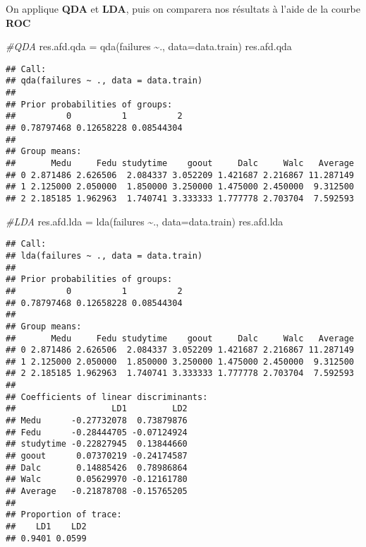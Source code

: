 \documentclass[
]{article}
\newenvironment{Shaded}{\begin{snugshade}}{\end{snugshade}}
\newcommand{\AttributeTok}[1]{\textcolor[rgb]{0.77,0.63,0.00}{#1}}
\newcommand{\CommentTok}[1]{\textcolor[rgb]{0.56,0.35,0.01}{\textit{#1}}}
\newcommand{\FunctionTok}[1]{\textcolor[rgb]{0.00,0.00,0.00}{#1}}
\newcommand{\NormalTok}[1]{#1}
\newcommand{\OtherTok}[1]{\textcolor[rgb]{0.56,0.35,0.01}{#1}}
\newcommand{\SpecialCharTok}[1]{\textcolor[rgb]{0.00,0.00,0.00}{#1}}
\begin{document}
On applique \textbf{QDA} et \textbf{LDA}, puis on comparera nos
résultats à l'aide de la courbe \textbf{ROC}

\begin{Shaded}
\begin{Highlighting}[]
\CommentTok{\#QDA}
\NormalTok{res.afd.qda }\OtherTok{=} \FunctionTok{qda}\NormalTok{(failures }\SpecialCharTok{\textasciitilde{}}\NormalTok{., }\AttributeTok{data=}\NormalTok{data.train)}
\NormalTok{res.afd.qda}
\end{Highlighting}
\end{Shaded}

\begin{verbatim}
## Call:
## qda(failures ~ ., data = data.train)
## 
## Prior probabilities of groups:
##          0          1          2 
## 0.78797468 0.12658228 0.08544304 
## 
## Group means:
##       Medu     Fedu studytime    goout     Dalc     Walc   Average
## 0 2.871486 2.626506  2.084337 3.052209 1.421687 2.216867 11.287149
## 1 2.125000 2.050000  1.850000 3.250000 1.475000 2.450000  9.312500
## 2 2.185185 1.962963  1.740741 3.333333 1.777778 2.703704  7.592593
\end{verbatim}

\begin{Shaded}
\begin{Highlighting}[]
\CommentTok{\#LDA}
\NormalTok{res.afd.lda }\OtherTok{=} \FunctionTok{lda}\NormalTok{(failures }\SpecialCharTok{\textasciitilde{}}\NormalTok{., }\AttributeTok{data=}\NormalTok{data.train)}
\NormalTok{res.afd.lda}
\end{Highlighting}
\end{Shaded}

\begin{verbatim}
## Call:
## lda(failures ~ ., data = data.train)
## 
## Prior probabilities of groups:
##          0          1          2 
## 0.78797468 0.12658228 0.08544304 
## 
## Group means:
##       Medu     Fedu studytime    goout     Dalc     Walc   Average
## 0 2.871486 2.626506  2.084337 3.052209 1.421687 2.216867 11.287149
## 1 2.125000 2.050000  1.850000 3.250000 1.475000 2.450000  9.312500
## 2 2.185185 1.962963  1.740741 3.333333 1.777778 2.703704  7.592593
## 
## Coefficients of linear discriminants:
##                   LD1         LD2
## Medu      -0.27732078  0.73879876
## Fedu      -0.28444705 -0.07124924
## studytime -0.22827945  0.13844660
## goout      0.07370219 -0.24174587
## Dalc       0.14885426  0.78986864
## Walc       0.05629970 -0.12161780
## Average   -0.21878708 -0.15765205
## 
## Proportion of trace:
##    LD1    LD2 
## 0.9401 0.0599
\end{verbatim}
\end{document}
